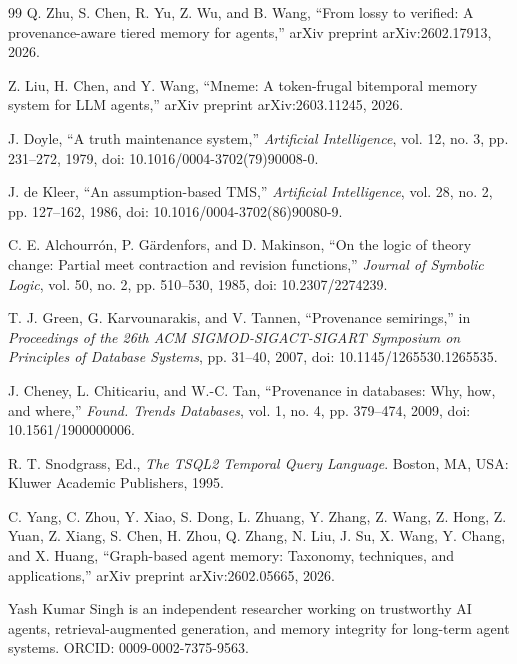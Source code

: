 \begin{thebibliography}{99}
Q. Zhu, S. Chen, R. Yu, Z. Wu, and B. Wang, ``From lossy to verified: A provenance-aware tiered memory for agents,'' arXiv preprint arXiv:2602.17913, 2026.

Z. Liu, H. Chen, and Y. Wang, ``Mneme: A token-frugal bitemporal memory system for LLM agents,'' arXiv preprint arXiv:2603.11245, 2026.

J. Doyle, ``A truth maintenance system,'' \emph{Artificial Intelligence}, vol. 12, no. 3, pp. 231--272, 1979, doi: 10.1016/0004-3702(79)90008-0.

J. de Kleer, ``An assumption-based TMS,'' \emph{Artificial Intelligence}, vol. 28, no. 2, pp. 127--162, 1986, doi: 10.1016/0004-3702(86)90080-9.

C. E. Alchourr\'on, P. G\"ardenfors, and D. Makinson, ``On the logic of theory change: Partial meet contraction and revision functions,'' \emph{Journal of Symbolic Logic}, vol. 50, no. 2, pp. 510--530, 1985, doi: 10.2307/2274239.

T. J. Green, G. Karvounarakis, and V. Tannen, ``Provenance semirings,'' in \emph{Proceedings of the 26th ACM SIGMOD-SIGACT-SIGART Symposium on Principles of Database Systems}, pp. 31--40, 2007, doi: 10.1145/1265530.1265535.

J. Cheney, L. Chiticariu, and W.-C. Tan, ``Provenance in databases: Why, how, and where,'' \emph{Found. Trends Databases}, vol. 1, no. 4, pp. 379--474, 2009, doi: 10.1561/1900000006.

R. T. Snodgrass, Ed., \emph{The TSQL2 Temporal Query Language}. Boston, MA, USA: Kluwer Academic Publishers, 1995.

C. Yang, C. Zhou, Y. Xiao, S. Dong, L. Zhuang, Y. Zhang, Z. Wang, Z. Hong, Z. Yuan, Z. Xiang, S. Chen, H. Zhou, Q. Zhang, N. Liu, J. Su, X. Wang, Y. Chang, and X. Huang, ``Graph-based agent memory: Taxonomy, techniques, and applications,'' arXiv preprint arXiv:2602.05665, 2026.

\end{thebibliography}

\begin{IEEEbiographynophoto}{Yash Kumar Singh}
is an independent researcher working on trustworthy AI agents, retrieval-augmented generation, and memory integrity for long-term agent systems. ORCID: 0009-0002-7375-9563.
\end{IEEEbiographynophoto}

\vfill


